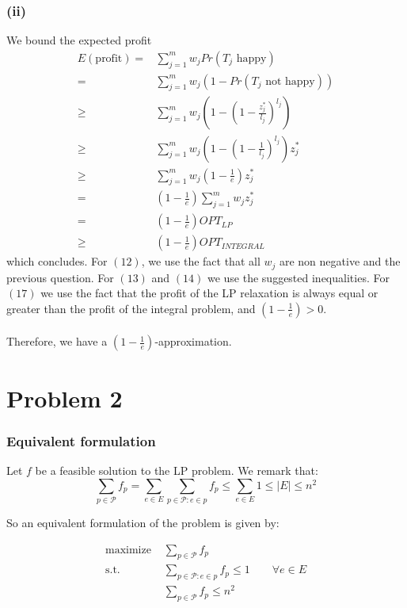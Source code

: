 \documentclass[a4paper, 11pt]{article}
\begin{document}
\subsubsection*{(ii)}
We bound the expected profit
\begin{align}
    E (\text{profit}) ={}&\sum_{j=1}^m w_j Pr(T_j\text{ happy})\\
    ={}&\sum_{j=1}^m w_j (1-Pr(T_j\text{ not happy}))\\
    \geq{}& \sum_{j=1}^m w_j \left(1-\left(1-\frac{z_j^*}{l_j}\right)^{l_j}\right)\\
    \geq{}& \sum_{j=1}^m w_j \left(1-\left(1-\frac{1}{l_j}\right)^{l_j}\right)z_j^*\\
    \geq{}& \sum_{j=1}^m w_j \left(1-\frac{1}{e}\right)z_j^*\\
    ={}& \left(1-\frac{1}{e}\right)\sum_{j=1}^m w_j z_j^*\\
    ={}& \left(1-\frac{1}{e}\right)OPT_{LP}\\
    \geq{}& \left(1-\frac{1}{e}\right)OPT_{INTEGRAL}
\end{align}
which concludes. For $(12)$, we use the fact that all $w_j$ are non negative and the previous question. For $(13)$ and $(14)$ we use the suggested inequalities. For $(17)$ we use the fact that the profit of the LP relaxation is always equal or greater than the profit of the integral problem, and $\left(1-\frac{1}{e}\right)>0$.\\\\
Therefore, we have a $\left(1-\frac{1}{e}\right)$-approximation.

\newpage

\section*{Problem 2}
\subsubsection*{Equivalent formulation}
Let $f$ be a feasible solution to the LP problem. We remark that:
$$
\sum_{p \in \mathcal{P}}f_p = \sum_{e \in E}\sum_{p \in \mathcal{P}: e \in p}f_p \le \sum_{e \in E}1\le|E| \le n^2
$$

So an equivalent formulation of the problem is given by:

\begin{align*}
    \text{maximize }&\sum_{p \in \mathcal{P}} f_p \\
    \text{s.t. }&\sum_{p \in \mathcal{P} : e \in p} f_p \le 1 \qquad
\forall e \in E \\
    &\sum_{p \in \mathcal{P}}f_p \le n^2
\end{align*}
\end{document}
